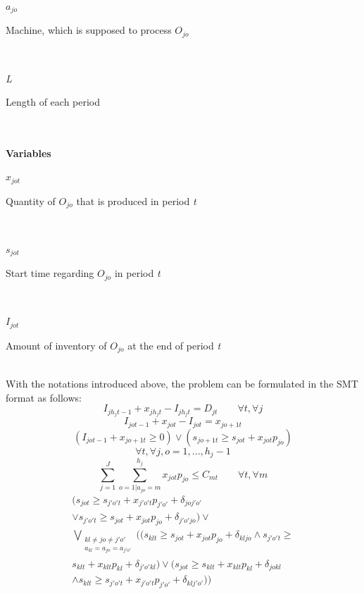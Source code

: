 \documentclass[letterpaper]{article} %
\begin{document}
\parbox{30pt}{\textit{$a_{jo}$}} 
\parbox[t]{207pt}{Machine, which is supposed to process $O_{jo}$}\\
\parbox{30pt}{\textit{L}} 
\parbox[t]{207pt}{Length of each period}\\
\\
\textbf{Variables}\\
\parbox{30pt}{\textit{$x_{jot}$}} 
\parbox[t]{207pt}{Quantity of $O_{jo}$ that is produced in period \textit{t}}\\
\parbox{30pt}{\textit{$s_{jot}$}} 
\parbox[t]{207pt}{Start time regarding $O_{jo}$ in period \textit{t}}\\
\parbox{30pt}{\textit{$I_{jot}$}} 
\parbox[t]{207pt}{Amount of inventory of $O_{jo}$ at the end of period \textit{t}}\\

With the notations introduced above, the problem can be formulated in the SMT format  as follows:
\begin{equation}
I_{j h_j t-1}+x_{j h_j t} - I_{j h_j t} = D_{jt} \quad\quad  \forall t, \forall j
\end{equation}
\begin{equation}
I_{j o t-1}+x_{j o t} - I_{j o t} = x_{j o+1 t}
\end{equation}
\begin{equation}
(I_{j o t-1}+x_{j o+1 t} \geq 0) \vee  (s_{j o+1 t} \geq s_{jot}+x_{jot}p_{jo})
\end{equation}
$$\forall t, \forall j,o=1,...,h_{j}-1$$
\begin{equation}
\sum_{j=1}^{J} \sum_{o=1|a_{jo}=m}^{h_{j}} x_{j o t} p_{jo} \leq C_{mt} \quad\quad  \forall t, \forall m
\end{equation}
\iffalse
\begin{multline}
\Big( s_{jot} \geq s_{j'o't} + x_{j'o't} p_{j'o'}+ \delta_{joj'o'} 
\\
\vee s_{j'o't}\geq s_{jot} + x_{jot} p_{jo} + \delta_{j'o'jo} \Big) \vee
\\
\bigvee\limits_{\substack{kl \neq jo \neq j'o' \\ a_{kl} = a_{jo}= a_{j'o'}}} \Big( \big( s_{klt} \geq s_{jot} + x_{jot} p_{jo}+ \delta_{kljo} \wedge s_{j'o't}\geq
\\
s_{klt} + x_{klt} p_{kl} + \delta_{j'o'kl} \big) \vee \big( s_{jot} \geq s_{klt} + x_{klt} p_{kl}+ \delta_{jokl} 
\\
\wedge s_{klt}\geq s_{j'o't} + x_{j'o't} p_{j'o'} + \delta_{klj'o'} \big) \Big)                       
\end{multline}
\end{document}
